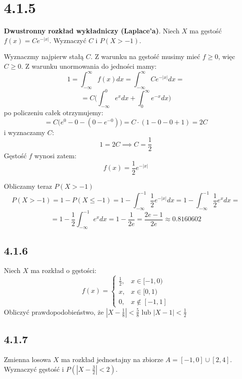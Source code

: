 \documentclass{article}
\begin{document}
\section*{4.1.5}
\begin{center}
    \textbf{Dwustronny rozkład wykładniczy (Laplace'a)}. Niech \(X\) ma gęstość \(f(x) = Ce^{-|x|}\).
    Wyznaczyć \(C\) i \(P(X > -1)\).
\end{center}
Wyznaczmy najpierw stałą \(C\). Z warunku na gęstość musimy mieć \(f \geq 0\), więc \(C \geq 0\). Z warunku unormowania do jedności mamy:
\begin{equation*}
    1 = \int_{-\infty}^{\infty} f(x)dx = \int_{-\infty}^{\infty} Ce^{-|x|} dx = 
\end{equation*}
\begin{equation*}
    = C \Big(\int_{-\infty}^{0} e^{x} dx + \int_{0}^{\infty} e^{-x} dx\Big)
\end{equation*}
po policzeniu całek otrzymujemy:
\begin{equation*}
    = C \Big(e^0 - 0 - (0 - e^{-0})\Big) = C \cdot (1 - 0 - 0 + 1) = 2C
\end{equation*}
i wyznaczamy \(C\):
\begin{equation*}
    1 = 2C \implies C = \frac{1}{2}
\end{equation*}
Gęstość \(f\) wynosi zatem:
\begin{equation*}
    f(x) = \frac{1}{2}e^{-|x|}
\end{equation*}
\par Obliczamy teraz \(P(X > -1)\)
\begin{equation*}
    P(X > -1) = 1 - P(X \leq -1) = 1 - \int_{-\infty}^{-1} \frac{1}{2}e^{-|x|} dx = 1 - \int_{-\infty}^{-1} \frac{1}{2}e^{x} dx = 
\end{equation*}
\begin{equation*}
    = 1 - \frac{1}{2} \int_{-\infty}^{-1} e^{x} dx = 1 - \frac{1}{2e} = \frac{2e - 1}{2e} \approx 0.8160602
\end{equation*}

\subsection*{4.1.6}
\begin{center}
    Niech \(X\) ma rozkład o gęstości:
    \begin{equation*}
        f(x) = 
            \begin{cases}
                \frac{1}{2},& x \in [-1, 0)\\
                x,& x \in [0, 1)\\
                0,& x \not\in [-1, 1] 
            \end{cases}
    \end{equation*}
    Obliczyć prawdopodobieństwo, że \(|X - \frac{1}{8}| < \frac{5}{8}\) lub \(|X - 1| < \frac{1}{2}\)
\end{center}


\subsection*{4.1.7}
\begin{center}
    Zmienna losowa \(X\) ma rozkład jednostajny na zbiorze \(A = [-1, 0] \cup [2, 4]\). Wyznaczyć gęstość i \(P(|X - \frac{3}{2}| < 2)\).
\end{center}
\end{document}
